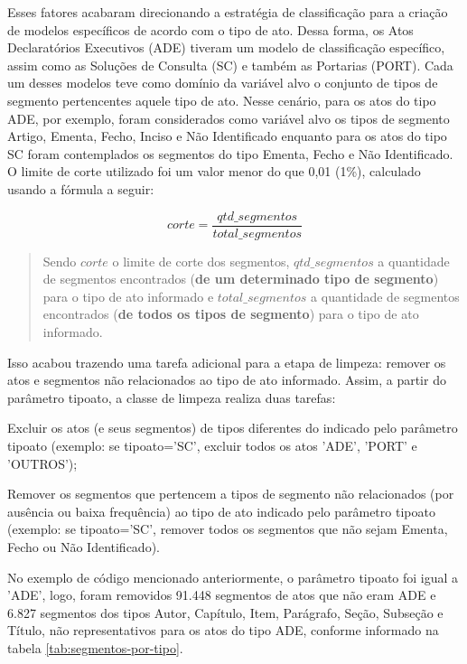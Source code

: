 Esses fatores acabaram direcionando a estratégia de classificação para a criação de modelos específicos de acordo com o tipo de ato. Dessa forma, os Atos Declaratórios Executivos (ADE) tiveram um modelo de classificação específico, assim como as Soluções de Consulta (SC) e também as Portarias (PORT). Cada um desses modelos teve como domínio da variável alvo o conjunto de tipos de segmento pertencentes aquele tipo de ato. Nesse cenário, para os atos do tipo ADE, por exemplo, foram considerados como variável alvo os tipos de segmento Artigo, Ementa, Fecho, Inciso e Não Identificado enquanto para os atos do tipo SC foram contemplados os segmentos do tipo Ementa, Fecho e Não Identificado. O limite de corte utilizado foi um valor menor do que 0,01 (1\%), calculado usando a fórmula a seguir:

\[ corte = \frac{qtd\_segmentos}{total\_segmentos} \]

\begin{quote}
Sendo \( corte \) o limite de corte dos segmentos, \( qtd\_segmentos \) a quantidade de segmentos encontrados (\textbf{de um determinado tipo de segmento}) para o tipo de ato informado e \( total\_segmentos \) a quantidade de segmentos encontrados (\textbf{de todos os tipos de segmento}) para o tipo de ato informado.
\end{quote}

Isso acabou trazendo uma tarefa adicional para a etapa de limpeza: remover os atos e segmentos não relacionados ao tipo de ato informado. Assim, a partir do parâmetro tipo\textunderscore ato, a classe de limpeza realiza duas tarefas: 
\begin{alineas}
	\item Excluir os atos (e seus segmentos) de tipos diferentes do indicado pelo parâmetro tipo\textunderscore ato (exemplo: se tipo\textunderscore ato='SC', excluir todos os atos 'ADE', 'PORT' e 'OUTROS');
	\item Remover os segmentos que pertencem a tipos de segmento não relacionados (por ausência ou baixa frequência) ao tipo de ato indicado pelo parâmetro tipo\textunderscore ato (exemplo: se tipo\textunderscore ato='SC', remover todos os segmentos que não sejam Ementa, Fecho ou Não Identificado).
\end{alineas}

No exemplo de código mencionado anteriormente, o parâmetro tipo\textunderscore ato foi igual a 'ADE', logo, foram removidos 91.448 segmentos de atos que não eram ADE e 6.827 segmentos dos tipos Autor, Capítulo, Item, Parágrafo, Seção, Subseção e Título, não representativos para os atos do tipo ADE, conforme informado na tabela \ref{tab:segmentos-por-tipo}. 